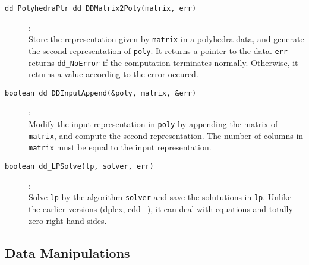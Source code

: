 \documentclass[11pt]{article}
\newcommand {\0} {{\bf 0}}
\begin{document}
\begin{description}
\item[{\tt dd\_PolyhedraPtr dd\_DDMatrix2Poly(matrix, err)}]:\\
Store the representation given by {\tt matrix} in a polyhedra data, and
generate the second representation of {\tt *poly}.  It returns
a pointer to the data. {\tt *err}
returns {\tt dd\_NoError} if the computation terminates normally.  Otherwise,
it returns a value according to the error occured.

\item[{\tt boolean dd\_DDInputAppend(\&poly, matrix, \&err)}]:\\
Modify the input representation in {\tt *poly}
by appending the matrix of {\tt *matrix}, and compute
the second representation.  The number of columns in
{\tt *matrix} must be equal to the input representation.

\item[{\tt boolean dd\_LPSolve(lp, solver, err)}]:\\
Solve {\tt lp} by the algorithm {\tt solver} and save
the solututions in {\tt *lp}.  Unlike the earlier versions
(dplex, cdd+), it can deal with equations and totally zero right
hand sides.
\end{description}


\subsection{Data Manipulations}  \label{DataLibrary}
\end{document}
